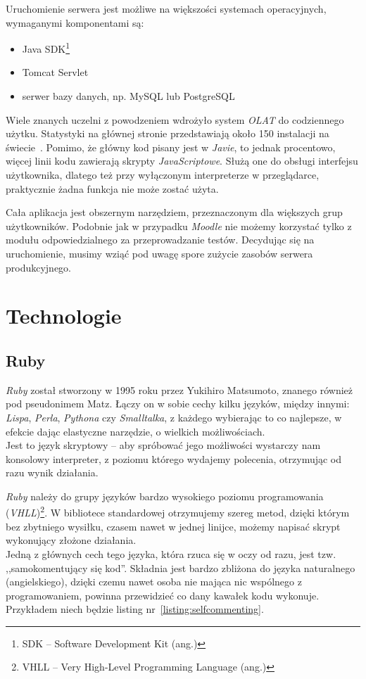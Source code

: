 \documentclass[12pt,twoside]{report}
\begin{document}
Uruchomienie serwera jest możliwe na większości systemach operacyjnych, wymaganymi
komponentami są:

\begin{itemize}
  \item{Java SDK\footnote{SDK -- Software Development Kit (ang.)}}
  \item{Tomcat Servlet}
  \item{serwer bazy danych, np. MySQL lub PostgreSQL}
\end{itemize}


Wiele znanych uczelni z powodzeniem wdrożyło system \emph{OLAT} do codziennego użytku.
Statystyki na głównej stronie przedstawiają około 150 instalacji na świecie~\cite{olat}.
Pomimo, że główny kod pisany jest w \emph{Javie}, to jednak procentowo, więcej linii kodu
zawierają skrypty \emph{JavaScriptowe}. Służą one do obsługi interfejsu użytkownika,
dlatego też przy wyłączonym interpreterze w przeglądarce, praktycznie żadna funkcja nie
może zostać użyta.


Cała aplikacja jest obszernym narzędziem, przeznaczonym dla większych grup użytkowników.
Podobnie jak w przypadku \emph{Moodle} nie możemy korzystać tylko z modułu
odpowiedzialnego za przeprowadzanie testów. Decydując się na uruchomienie, musimy wziąć
pod uwagę spore zużycie zasobów serwera produkcyjnego.


\cleardoublepage
\chapter{Technologie}
\section{Ruby}
\emph{Ruby} został stworzony w 1995 roku przez Yukihiro Matsumoto, znanego również
pod pseudonimem Matz. Łączy on w sobie cechy kilku języków, między innymi: \emph{Lispa},
\emph{Perla}, \emph{Pythona} czy \emph{Smalltalka}, z każdego wybierając to co najlepsze,
w efekcie dając elastyczne narzędzie, o wielkich możliwościach.\\
Jest to język skryptowy -- aby spróbować jego możliwości wystarczy nam konsolowy
interpreter, z poziomu którego wydajemy polecenia, otrzymując od razu wynik działania.


\emph{Ruby} należy do grupy języków bardzo wysokiego poziomu programowania
(\emph{VHLL})\footnote{VHLL -- Very High-Level Programming Language (ang.)}.
W bibliotece standardowej otrzymujemy szereg metod, dzięki którym bez zbytniego wysiłku,
czasem nawet w jednej linijce, możemy napisać skrypt wykonujący złożone działania.\\
Jedną z głównych cech tego języka, która rzuca się w oczy od razu, jest tzw.
,,samokomentujący się kod''. Składnia jest bardzo zbliżona do języka naturalnego
(angielskiego), dzięki czemu nawet osoba nie mająca nic wspólnego z programowaniem,
powinna przewidzieć co dany kawałek kodu wykonuje. Przykładem niech będzie
listing nr~\ref{listing:selfcommenting}.
\end{document}
